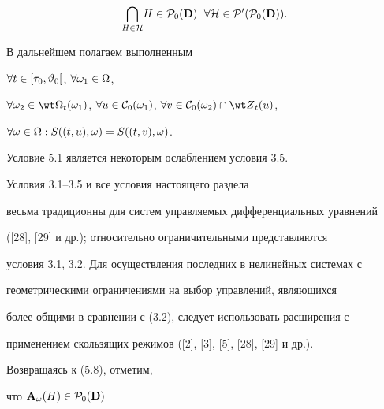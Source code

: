 \begin{equation}


{\bigcap\limits_{H \in {\cal


H}}}{H} \in {{\cal P}_0}({\bold D})\ \;


\fo{\cal H} \in {{\cal P}'}({{\cal P}_0}({\bold D})).


\end{equation}


В дальнейшем полагаем выполненным





\begin{conds}


$\forall{t} \in [{{\tau}_0},{{\vartheta}_0}[$, $\forall{{\omega}_1} \in \Omega$,


$\fo{{\omega}_2} \in {{\wt \Om}_t}({\omega}_1)$, $\fo{u} \in


{{\cal C}_0}({\omega}_1)$, $\fo{v} \in {{\cal C}_0}({\omega}_2) \cap


{{\wt Z}_t}(u)$,


$\forall{\omega} \in \Omega:S((t,u),\omega) = S((t,v),\omega)$.


\end{conds}





\begin{notes}


Условие 5.1 является некоторым ослаблением условия 3.5.


Условия 3.1--3.5 и все условия настоящего раздела


весьма традиционны для систем управляемых дифференциальных уравнений


([28], [29] и др.); относительно ограничительными представляются


условия 3.1, 3.2. Для осуществления последних в нелинейных системах с


геометрическими ограничениями на выбор управлений, являющихся


более общими в сравнении с (3.2), следует использовать расширения с


применением скользящих режимов ([2], [3], [5], [28], [29] и др.).


\end{notes}





Возвращаясь к (5.8), отметим,


что  ${{\bold A}_\omega}(H) \in {{\cal P}_0}({\bold D})$


